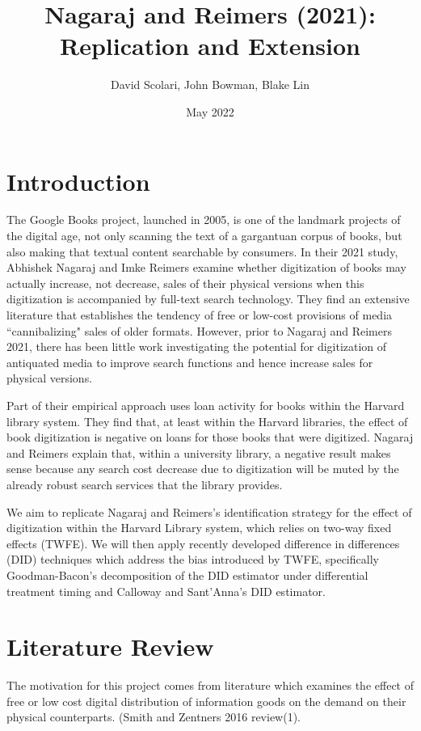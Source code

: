 \documentclass{article}
\author{David Scolari, John Bowman, Blake Lin}
\title{Nagaraj and Reimers (2021): Replication and Extension}
\date{May 2022}
\begin{document}
\maketitle

\begin{abstract}
\end{abstract}

\section{Introduction}
The Google Books project, launched in 2005, is one of the landmark projects of the digital age, not only scanning the text of a gargantuan corpus of books, but also making that textual content searchable by consumers. In their 2021 study, Abhishek Nagaraj and Imke Reimers examine whether digitization of books may actually increase, not decrease, sales of their physical versions when this digitization is accompanied by full-text search technology. They find an extensive literature that establishes the tendency of free or low-cost provisions of media ``cannibalizing" sales of older formats. However, prior to Nagaraj and Reimers 2021, there has been little work investigating the potential for digitization of antiquated media to improve search functions and hence increase sales for physical versions. 

Part of their empirical approach uses loan activity for books within the Harvard library system. They find that, at least within the Harvard libraries, the effect of book digitization is negative on loans for those books that were digitized. Nagaraj and Reimers explain that, within a university library, a negative result makes sense because any search cost decrease due to digitization will be muted by the already robust search services that the library provides. 

We aim to replicate Nagaraj and Reimers's identification strategy for the effect of digitization within the Harvard Library system, which relies on two-way fixed effects (TWFE). We will then apply recently developed difference in differences (DID) techniques which address the bias introduced by TWFE, specifically Goodman-Bacon's decomposition of the DID estimator under differential treatment timing and Calloway and Sant'Anna's DID estimator. 

\section{Literature Review}
The motivation for this project comes from literature which examines the effect of free or low cost digital distribution of information goods on the demand on their physical counterparts. (Smith and Zentners 2016 review(1). 
\end{document}
